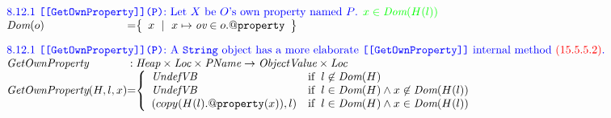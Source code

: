 \documentclass[a4paper, leqno]{amsart}
\newcommand{\mkst}[2]{#1::#2}
\def\inred{\color{red}}
\def\inblue{\color{blue}}
\def\ingreen{\color{green}}
\newcommand{\strict}{{\inred\tt strict}}
\newcommand{\UndefVB}{\emph{UndefVB}}
\newcommand{\false}{{\tt false}}
\newcommand{\ve}{\emph{ValError}}
\newcommand{\re}{{\tt ReferenceError}}
\newcommand{\Val}{\emph{Val}}
\newcommand{\Loc}{\emph{Loc}}
\newcommand{\ObjV}{\emph{ObjectValue}}
\newcommand{\Heap}{\emph{Heap}}
\newcommand{\Prop}{\emph{PName}}
\newcommand{\Env}{\emph{Env}}
\renewcommand{\lg}{{\tt \#Global}}
\newcommand{\hf}[1]{\emph{#1}}
\newcommand{\varloc}[1]{{\tt \##1}}
\newcommand{\ifc}[1]{{\rm if}\begin{array}[t]{l}#1\end{array}}
\newcommand{\set}[1]{\left\{\begin{array}{l}#1\end{array}\right\}}
\def\inred{\color{red}}
\def\inblue{\color{blue}}
\begin{document}
\[\begin{array}{l@{}c@{}l}


\multicolumn{3}{l}{\mbox{\inblue 8.12.1 {\tt [[GetOwnProperty]](P)}:
Let $X$ be $O$'s own property named $P$. {\ingreen$x\in\hf{Dom}(H(l))$}}}\\
\hf{Dom}(o) &=&
\set{x\ \mid\ x\mapsto \emph{ov} \in o.{\tt @property}}
\\[1em]

\multicolumn{3}{l}{\mbox{\inblue 8.12.1 {\tt [[GetOwnProperty]](P)}:
A {\tt String} object has a more elaborate {\tt [[GetOwnProperty]]} internal method {\inred (15.5.5.2)}.}}\\
\hf{GetOwnProperty} & :& \Heap \times \Loc \times \Prop \rightarrow \ObjV \times \Loc \\
\hf{GetOwnProperty}(H,l,x) & =&
\left\{\begin{array}{ll}
\UndefVB & \ifc{l\not\in \hf{Dom}(H)} \\
\UndefVB & \ifc{l\in\hf{Dom}(H)\wedge x\not\in\hf{Dom}(H(l))} \\
(copy(H(l).{\tt @property}(x)), l) & \ifc{l\in\hf{Dom}(H)\wedge x\in\hf{Dom}(H(l))}
\end{array}\right.
\\[2em]


\end{array}
\]
\end{document}
